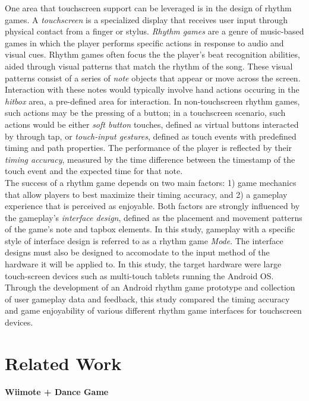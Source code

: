 \documentclass{sig-alternate}
\begin{document}
One area that touchscreen support can be leveraged is in the design of rhythm games. A \textit{touchscreen} is a specialized display that receives user input through physical contact from a finger or stylus. \textit{Rhythm games} are a genre of music-based games in which the player performs specific actions in response to audio and visual cues. Rhythm games often focus the the player's beat recognition abilities, aided through visual patterns that match the rhythm of the song. These visual patterns consist of a series of \textit{note} objects that appear or move across the screen. Interaction with these notes would typically involve hand actions occuring in the \textit{hitbox} area, a pre-defined area for interaction. In non-touchscreen rhythm games, such actions may be the pressing of a button; in a touchscreen scenario, such actions would be either \textit{soft button} touches, defined as virtual buttons interacted by through tap, or \textit{touch-input gestures}, defined as touch events with predefined timing and path properties. The performance of the player is reflected by their \textit{timing accuracy}, measured by the time difference between the timestamp of the touch event and the expected time for that note.\\

The success of a rhythm game depends on two main factors: 1) game mechanics that allow players to best maximize their timing accuracy, and 2) a gameplay experience that is perceived as enjoyable. Both factors are strongly influenced by the gameplay's \textit{interface design}, defined as the placement and movement patterns of the game's note and tapbox elements. In this study, gameplay with a specific style of interface design is referred to as a rhythm game \textit{Mode}. The interface designs must also be designed to accomodate to the input method of the hardware it will be applied to. In this study, the target hardware were large touch-screen devices such as multi-touch tablets running the Android OS. Through the development of an Android rhythm game prototype and collection of user gameplay data and feedback, this study compared the timing accuracy and game enjoyability of various different rhythm game interfaces for touchscreen devices.

\section{Related Work}
\label{sec:related_work}

\noindent \textbf{Wiimote + Dance Game}
\end{document}
